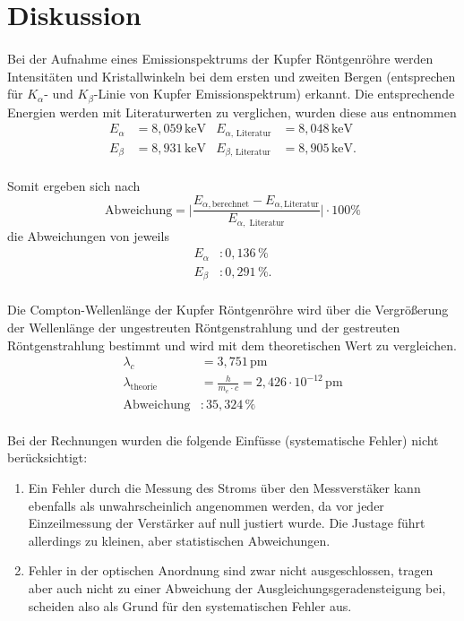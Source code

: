 \section{Diskussion}
\label{sec:Diskussion}
\paragraph{}
Bei der Aufnahme eines Emissionspektrums der Kupfer Röntgenröhre werden Intensitäten und Kristallwinkeln bei dem ersten und zweiten Bergen (entsprechen für $K_\alpha$- und $K_\beta$-Linie von Kupfer Emissionspektrum) erkannt.
Die entsprechende Energien werden  mit Literaturwerten zu verglichen, wurden diese aus \cite{XT} entnommen\\
\begin{align*}
    E_{\alpha} &= 8,059 \,\mathrm{keV}  &   E_{\alpha,\,\text{Literatur}} &= 8,048 \,\mathrm{keV} \\
    E_{\beta} &= 8,931\,\mathrm{keV}  & E_{\beta,\,\text{Literatur}} &= 8,905 \,\mathrm{keV} .\\
\end{align*}


Somit ergeben sich nach  
\begin{equation}
    \text{Abweichung} = \Big\vert\frac{E_{\alpha, \text{berechnet}}-E_{\alpha, \text{Literatur}}}{E_{\alpha,\text{ Literatur}}}\Big\vert \cdot 100 \%
\end{equation}
die Abweichungen von jeweils 
\begin{align*}
    E_{\alpha} &: 0,136 \,\% \\
    E_{\beta} &: 0,291 \,\% .\\
\end{align*} 

Die Compton-Wellenlänge der Kupfer Röntgenröhre wird über die Vergrößerung der Wellenlänge der ungestreuten Röntgenstrahlung und der gestreuten Röntgenstrahlung bestimmt und wird mit dem theoretischen Wert zu vergleichen.
\begin{align*}
    \lambda_c &= 3,751 \,\mathrm{pm}\\
    \lambda_{\text{theorie}} &=\frac{h}{m_e \cdot c} = 2,426 \cdot 10^{-12}\,\mathrm{pm}\\
    \mathrm{Abweichung}&: 35,324 \, \% \\
\end{align*} 

Bei der Rechnungen wurden die folgende Einfüsse (systematische Fehler) nicht berücksichtigt:
\begin{enumerate}
    \item Ein Fehler durch die Messung des Stroms über den Messverstäker kann ebenfalls als unwahrscheinlich angenommen werden, da vor jeder Einzeilmessung der Verstärker auf null justiert wurde.
    Die Justage führt allerdings zu kleinen, aber statistischen Abweichungen.
    \item Fehler in der optischen Anordnung sind zwar nicht ausgeschlossen, tragen aber auch nicht zu einer Abweichung der Ausgleichungsgeradensteigung bei, scheiden also als Grund für den systematischen Fehler aus.
\end{enumerate}

